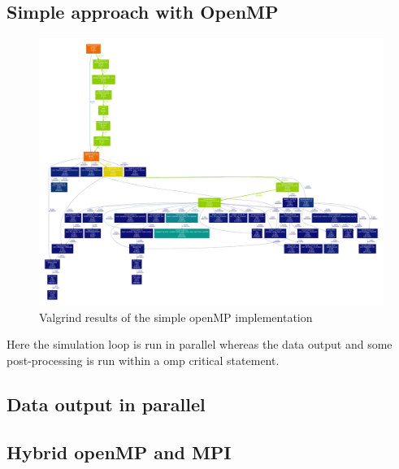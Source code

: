 \subsection{Simple approach with OpenMP}

\begin{figure}[!htbp]
  \centering
  \includegraphics[height=0.85\textheight, angle=90]{images/profOpenMPSimple.pdf}
  \caption{Valgrind results of the simple openMP implementation}
  \label{fig:simpleOpenMP}
\end{figure}

Here the simulation loop is run in parallel whereas the data output
and some post-processing is run within a omp critical statement.

\subsection{Data output in parallel}


\subsection{Hybrid openMP and MPI}



